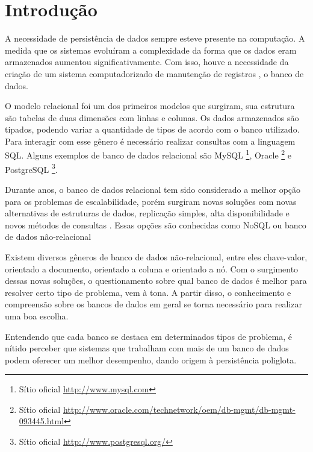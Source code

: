 \chapter{Introdução}\label{chap:introducao}
A necessidade de persistência de dados sempre esteve presente na computação. A medida que os sistemas evoluíram a complexidade da forma que os dados eram armazenados aumentou significativamente. Com isso, houve a necessidade da criação de um sistema computadorizado de manutenção de registros \cite{CJDate}, o banco de dados.

O modelo relacional foi um dos primeiros modelos que surgiram, sua estrutura são tabelas de duas dimensões com linhas e colunas. Os dados armazenados são tipados, podendo variar a quantidade de tipos de acordo com o banco utilizado. Para interagir com esse gênero é necessário realizar consultas com a linguagem \ac{SQL}. Alguns exemplos de banco de dados relacional são MySQL \footnote{Sítio oficial  \url{http://www.mysql.com}}, Oracle \footnote{Sítio oficial  \url{http://www.oracle.com/technetwork/oem/db-mgmt/db-mgmt-093445.html}} e PostgreSQL \footnote{Sítio oficial \url{http://www.postgresql.org/}}.

Durante anos, o banco de dados relacional tem sido considerado a melhor opção para os problemas de escalabilidade, porém surgiram novas soluções com novas alternativas de estruturas de dados, replicação simples, alta disponibilidade e novos métodos de consultas \cite{SDSW}. Essas opções são conhecidas como NoSQL ou banco de dados não-relacional

Existem diversos gêneros de banco de dados não-relacional, entre eles chave-valor, orientado a documento, orientado a coluna e orientado a nó. Com o surgimento dessas novas soluções, o questionamento sobre qual banco de dados é melhor para resolver certo tipo de problema, vem à tona. A partir disso, o conhecimento e compreensão sobre os bancos de dados em geral se torna necessário para realizar uma boa escolha.

Entendendo que cada banco se destaca em determinados tipos de problema, é nítido perceber que sistemas que trabalham com mais de um banco de dados podem oferecer um melhor desempenho, dando origem à persistência poliglota.

